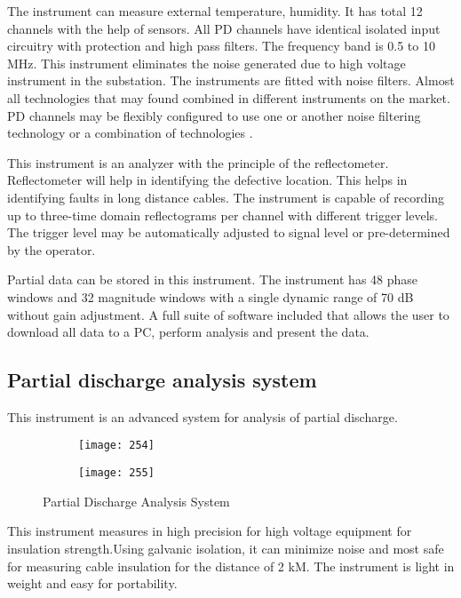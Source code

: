 The instrument can measure external temperature, humidity. It has total 12 channels with the help of sensors. All PD channels have identical isolated input circuitry with protection and high pass filters. The frequency band is 0.5 to 10 MHz. This instrument eliminates the noise generated due to high voltage instrument in the substation. The instruments are fitted with noise filters. Almost all technologies that may found combined in different instruments on the market. PD channels may be flexibly configured to use one or another noise filtering technology or a combination of technologies \setlength{\parskip}{1em} \cite{gurin1975measurements}.

This instrument is an analyzer with the principle of the reflectometer. Reflectometer will help in identifying the defective location. This helps in identifying faults in long distance cables. The instrument is capable of recording up to three-time domain reflectograms per channel with different trigger levels. The trigger level may be automatically adjusted to signal level or pre-determined by the operator.

Partial data can be stored in this instrument. The instrument has 48 phase windows and 32 magnitude windows with a single dynamic range of 70 dB without gain adjustment. A full suite of software included that allows the user to download all data to a PC, perform analysis and present the data\setlength{\parskip}{0em}.

\subsection{Partial discharge analysis system}
 This instrument is an advanced system for analysis of partial discharge.
 
\begin{figure}[h!]
    \centering
    \begin{subfigure}[b]{0.30\textwidth}
        \centering
        \texttt{[image: 254]}
    \end{subfigure}
    \begin{subfigure}[b]{0.60\textwidth}
        \centering
        \texttt{[image: 255]}
    \end{subfigure}
    
    \caption{Partial Discharge Analysis System}
    \label{fig:Partial Discharge Analysis System}
\end{figure}

This instrument measures in high precision for high voltage equipment for insulation strength.Using galvanic isolation, it can minimize noise and most safe for measuring cable insulation for the distance of 2 kM. The instrument is light in weight and easy for portability\setlength{\parskip}{1em}. 

